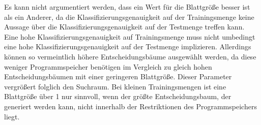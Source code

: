 \newline
\newline
Es kann nicht argumentiert werden, dass ein Wert für die Blattgröße besser ist als ein Anderer, da die Klassifizierungsgenauigkeit auf der Trainingsmenge keine Aussage über die Klassifizierungsgenauigkeit auf
der Testmenge treffen kann. Eine hohe Klassifizierungsgenauigkeit auf Trainingsmenge muss nicht umbedingt eine hohe Klassifizierungsgenauigkeit auf der Testmenge implizieren. Allerdings können so vermeintlich
höhere Entscheidungsbäume ausgewählt werden, da diese weniger Programmspeicher benötigen im Vergleich zu gleich hohen Entscheidungsbäumen mit einer geringeren Blattgröße. Dieser Parameter vergrößert folglich
den Suchraum. Bei kleinen Trainingsmengen ist eine Blattgröße über 1 nur sinnvoll, wenn der größte Entscheidungsbaum, der generiert werden kann, nicht innerhalb der Restriktionen des Programmspeichers liegt.